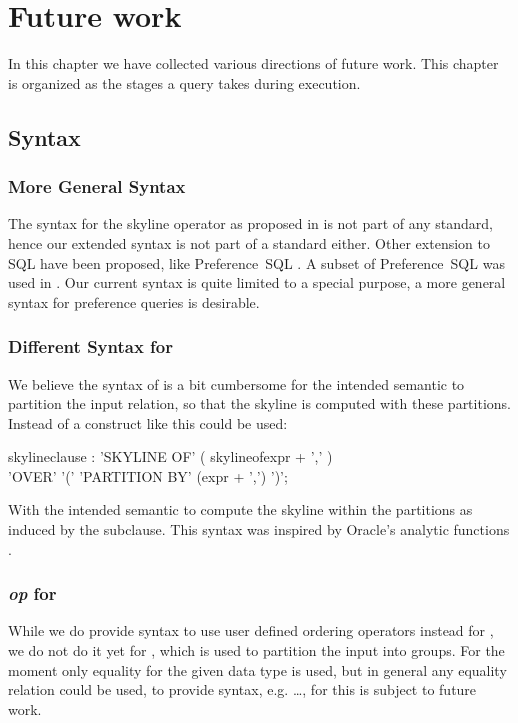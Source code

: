 


\chapter{Future work}
\label{chap:future-work}
In this chapter we have collected various directions of future work.
This chapter is organized as the stages a query takes during
execution.

\section{Syntax}
\subsection{More General Syntax}
The syntax for the skyline operator as proposed
in \citep{Borzsonyi2001} is not part of any standard, hence our
extended syntax is not part of a standard either.  Other extension to
SQL have been proposed, like Preference~SQL \citep{Kiessling2002a}.  A
subset of Preference~SQL was used in \citep{Chaudhuri2006}.  Our
current syntax is quite limited to a special purpose, a more general
syntax for preference queries is desirable.

\subsection{Different Syntax for }
We believe the syntax of  is a bit
cumbersome for the intended semantic to partition the input relation,
so that the skyline is computed with these partitions. Instead
of  a construct like this could be used:

\begin{rail}
skylineclause : 
    'SKYLINE OF' ( skylineofexpr + ',' ) \\ 'OVER' '(' 'PARTITION BY' (expr + ',') ')';
\end{rail}

\noindent
With the intended semantic to compute the skyline within the
partitions as induced by the  subclause. This
syntax was inspired by Oracle's analytic functions \citep[Page~5-10]{Oracle2005}.


\subsection{ \emph{op} for }
While we do provide syntax to use user defined ordering operators
instead for , we do not do it yet for
, which is used to partition the input
into groups.  For the moment only equality for the given data type is
used, but in general any equality relation could be used, to provide
syntax, e.g. \dots {}, for this
is subject to future work.


